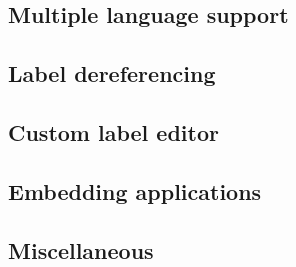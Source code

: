 \subsection{Multiple language support}

\subsection{Label dereferencing}

\subsection{Custom label editor}

\subsection{Embedding applications}

\subsection{Miscellaneous}

